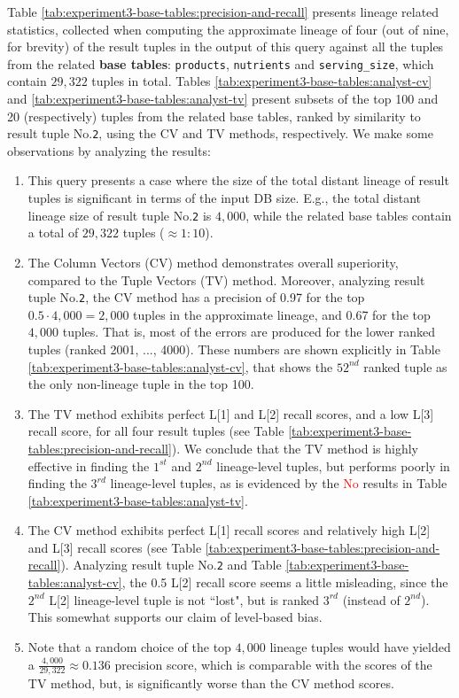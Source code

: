 \begin{experiment-withrun}
Table \ref{tab:experiment3-base-tables:precision-and-recall} presents lineage related statistics, collected when computing the approximate lineage of four (out of nine, for brevity) of the result tuples in the output of this query against all the tuples from the related \textbf{base tables}: \texttt{products}, \texttt{nutrients} and \texttt{serving\_size}, which contain $29,322$ tuples in total. Tables \ref{tab:experiment3-base-tables:analyst-cv} and \ref{tab:experiment3-base-tables:analyst-tv} present subsets of the top 100 and 20 (respectively) tuples from the related base tables, ranked by similarity to result tuple No.\texttt{2}, using the CV and TV methods, respectively. We make some observations by analyzing the results:
\begin{enumerate}
    \item This query presents a case where the size of the total distant lineage of result tuples is significant in terms of the input DB size. E.g., the total distant lineage size of result tuple No.\texttt{2} is $4,000$, while the related base tables contain a total of $29,322$ tuples ($\approx 1:10$).
    \item The Column Vectors (CV) method demonstrates overall superiority, compared to the Tuple Vectors (TV) method. Moreover, analyzing result tuple No.\texttt{2}, the CV method has a precision of 0.97 for the top $0.5\cdot4,000 = 2,000$ tuples in the approximate lineage, and 0.67 for the top $4,000$ tuples. That is, most of the errors are produced for the lower ranked tuples (ranked 2001, ..., 4000). These numbers are shown explicitly in Table \ref{tab:experiment3-base-tables:analyst-cv}, that shows the $52^{nd}$ ranked tuple as the only non-lineage tuple in the top 100.
    \item The TV method exhibits perfect L[1] and L[2] recall scores, and a low L[3] recall score, for all four result tuples (see Table \ref{tab:experiment3-base-tables:precision-and-recall}). We conclude that the TV method is highly effective in finding the $1^{st}$ and $2^{nd}$ lineage-level tuples, but performs poorly in finding the $3^{rd}$ lineage-level tuples, as is evidenced by the \textcolor{Red}{No} results in Table \ref{tab:experiment3-base-tables:analyst-tv}.
    \item The CV method exhibits perfect L[1] recall scores and relatively high L[2] and L[3] recall scores (see Table \ref{tab:experiment3-base-tables:precision-and-recall}). Analyzing result tuple No.\texttt{2} and Table \ref{tab:experiment3-base-tables:analyst-cv}, the 0.5 L[2] recall score seems a little misleading, since the $2^{nd}$ L[2] lineage-level tuple is not ``lost", but is ranked $3^{rd}$ (instead of $2^{nd}$). This somewhat supports our claim of level-based bias.
    \item Note that a random choice of the top $4,000$ lineage tuples would have yielded a $\frac{4,000}{29,322} \approx 0.136$ precision score, which is comparable with the scores of the TV method, but, is significantly worse than the CV method scores.
\end{enumerate}


\end{experiment-withrun}
